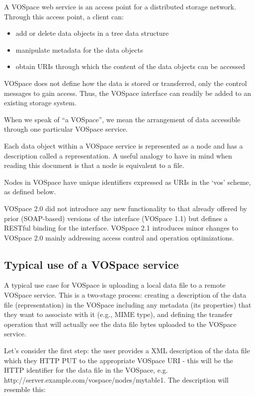\documentclass[11pt,a4paper]{ivoa}
\begin{document}
A VOSpace web service is an access point for a distributed storage network. Through this access point, a client can:

\begin{itemize}
    \item add or delete data objects in a tree data structure
    \item manipulate metadata for the data objects
    \item obtain URIs through which the content of the data objects can be accessed
\end{itemize}
VOSpace does not define how the data is stored or transferred, only the control messages to gain access. Thus, the VOSpace interface can readily be added to an existing storage system.

When we speak of ``a VOSpace'', we mean the arrangement of data accessible through one particular VOSpace service.

Each data object within a VOSpace service is represented as a node and has a description called a representation. A useful analogy to have in mind when reading this document is that a node is equivalent to a file.

Nodes in VOSpace have unique identifiers expressed as URIs in the `vos' scheme, as defined below.

VOSpace 2.0 did not introduce any new functionality to that already offered by prior (SOAP-based) versions of the interface (VOSpace 1.1) but defines a RESTful binding for the interface. VOSpace 2.1 introduces minor changes to VOSpace 2.0 mainly addressing access control and operation optimizations.

\subsection{Typical use of a VOSpace service}
\label{subsec:typical use of a vospace service}
A typical use case for VOSpace is uploading a local data file to a remote VOSpace service. This is a two-stage process: creating a description of the data file (representation) in the VOSpace including any metadata (its properties) that they want to associate with it (e.g., MIME type), and defining the transfer operation that will actually see the data file bytes uploaded to the VOSpace service.

Let's consider the first step: the user provides a XML description of the data file which they HTTP PUT to the appropriate VOSpace URI - this will be the HTTP identifier for the data file in the VOSpace, e.g. http://server.example.com/vospace/nodes/mytable1. The description will resemble this:
\end{document}
